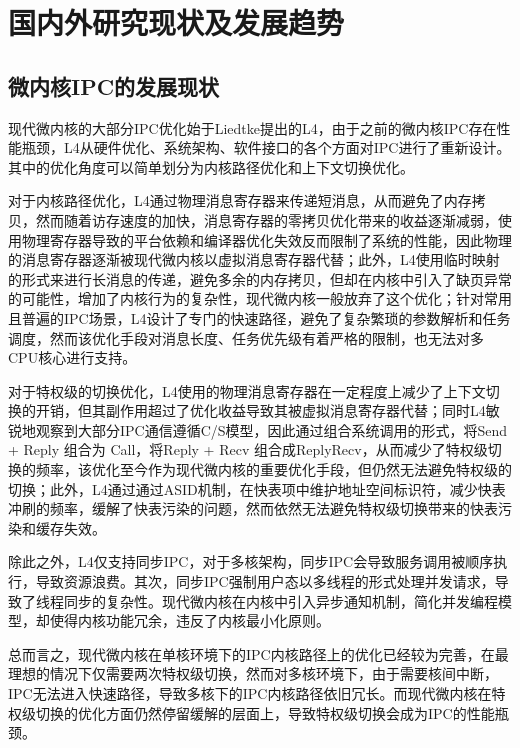\section{国内外研究现状及发展趋势}

\subsection{微内核IPC的发展现状}

现代微内核的大部分IPC优化始于Liedtke提出的L4，由于之前的微内核IPC存在性能瓶颈，L4从硬件优化、系统架构、软件接口的各个方面对IPC进行了重新设计。其中的优化角度可以简单划分为内核路径优化和上下文切换优化。

对于内核路径优化，L4通过物理消息寄存器来传递短消息，从而避免了内存拷贝，然而随着访存速度的加快，消息寄存器的零拷贝优化带来的收益逐渐减弱，使用物理寄存器导致的平台依赖和编译器优化失效反而限制了系统的性能\cite{heiser2016l4}，因此物理的消息寄存器逐渐被现代微内核以虚拟消息寄存器代替；此外，L4使用临时映射的形式来进行长消息的传递，避免多余的内存拷贝，但却在内核中引入了缺页异常的可能性，增加了内核行为的复杂性\cite{heiser2016l4}，现代微内核一般放弃了这个优化；针对常用且普遍的IPC场景，L4设计了专门的快速路径，避免了复杂繁琐的参数解析和任务调度，然而该优化手段对消息长度、任务优先级有着严格的限制，也无法对多CPU核心进行支持。

对于特权级的切换优化，L4使用的物理消息寄存器在一定程度上减少了上下文切换的开销，但其副作用超过了优化收益导致其被虚拟消息寄存器代替\cite{heiser2016l4}；同时L4敏锐地观察到大部分IPC通信遵循C/S模型，因此通过组合系统调用的形式，将Send + Reply 组合为 Call，将Reply + Recv 组合成ReplyRecv，从而减少了特权级切换的频率，该优化至今作为现代微内核的重要优化手段，但仍然无法避免特权级的切换；此外，L4通过通过ASID机制，在快表项中维护地址空间标识符，减少快表冲刷的频率，缓解了快表污染的问题，然而依然无法避免特权级切换带来的快表污染和缓存失效。

除此之外，L4仅支持同步IPC，对于多核架构，同步IPC会导致服务调用被顺序执行，导致资源浪费。其次，同步IPC强制用户态以多线程的形式处理并发请求，导致了线程同步的复杂性。现代微内核在内核中引入异步通知机制，简化并发编程模型，却使得内核功能冗余，违反了内核最小化原则。

总而言之，现代微内核在单核环境下的IPC内核路径上的优化已经较为完善，在最理想的情况下仅需要两次特权级切换，然而对多核环境下，由于需要核间中断，IPC无法进入快速路径，导致多核下的IPC内核路径依旧冗长。而现代微内核在特权级切换的优化方面仍然停留缓解的层面上，导致特权级切换会成为IPC的性能瓶颈。


